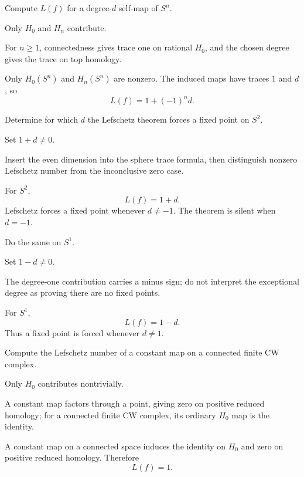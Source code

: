 \begin{exercise}\label{exr:viii35-02}
Compute $L(f)$ for a degree-$d$ self-map of $S^n$.
\end{exercise}
\begin{hint}
Only $H_0$ and $H_n$ contribute.

For \(n\ge1\), connectedness gives trace one on rational \(H_0\), and the chosen degree gives the trace on top homology.
\end{hint}
\begin{solution}
Only \(H_0(S^n)\) and \(H_n(S^n)\) are nonzero. The induced maps have traces \(1\) and \(d\), so
\[
L(f)=1+(-1)^n d.
\]
\end{solution}

\begin{exercise}\label{exr:viii35-03}
Determine for which $d$ the Lefschetz theorem forces a fixed point on $S^2$.
\end{exercise}
\begin{hint}
Set $1+d\ne0$.

Insert the even dimension into the sphere trace formula, then distinguish nonzero Lefschetz number from the inconclusive zero case.
\end{hint}
\begin{solution}
For \(S^2\),
\[
L(f)=1+d.
\]
Lefschetz forces a fixed point whenever \(d\ne-1\). The theorem is silent when \(d=-1\).
\end{solution}

\begin{exercise}\label{exr:viii35-04}
Do the same on $S^1$.
\end{exercise}
\begin{hint}
Set $1-d\ne0$.

The degree-one contribution carries a minus sign; do not interpret the exceptional degree as proving there are no fixed points.
\end{hint}
\begin{solution}
For \(S^1\),
\[
L(f)=1-d.
\]
Thus a fixed point is forced whenever \(d\ne1\).
\end{solution}

\begin{exercise}\label{exr:viii35-05}
Compute the Lefschetz number of a constant map on a connected finite CW complex.
\end{exercise}
\begin{hint}
Only $H_0$ contributes nontrivially.

A constant map factors through a point, giving zero on positive reduced homology; for a connected finite CW complex, its ordinary \(H_0\) map is the identity.
\end{hint}
\begin{solution}
A constant map on a connected space induces the identity on \(H_0\) and zero on positive reduced homology. Therefore
\[
L(f)=1.
\]
\end{solution}

